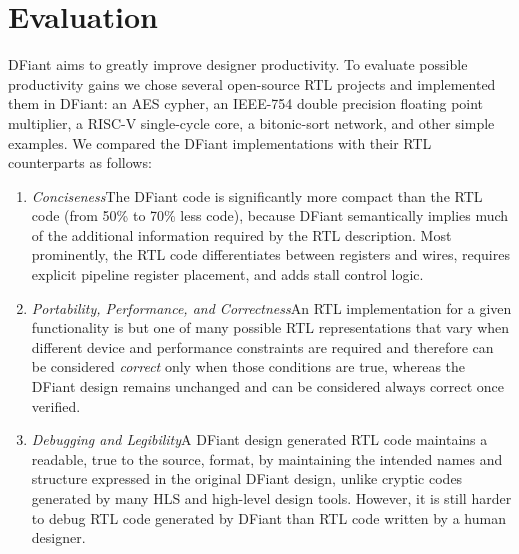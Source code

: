 \section{Evaluation}
\label{sec:evaluation}
DFiant aims to greatly improve designer productivity. To evaluate possible productivity gains we chose several open-source RTL projects and implemented them in DFiant: an AES cypher, an IEEE-754 double precision floating point multiplier, a RISC-V single-cycle core, a bitonic-sort network, and other simple examples.
We compared the DFiant implementations with their RTL counterparts as follows:
\begin{enumerate}[leftmargin=*]
	\item \textit{Conciseness}\quad The DFiant code is significantly more compact than the RTL code (from 50\% to 70\% less code), because DFiant semantically implies much of the additional information required by the RTL description. Most prominently, the RTL code differentiates between registers and wires, requires explicit pipeline register placement, and adds stall control logic. 
	\item \textit{Portability, Performance, and Correctness}\quad An RTL implementation for a given functionality is but one of many possible RTL representations that vary when different device and performance constraints are required and therefore can be considered \textit{correct} only when those conditions are true, whereas the DFiant design remains unchanged and can be considered always correct once verified. 
	\item \textit{Debugging and Legibility}\quad A DFiant design generated RTL code maintains a readable, true to the source, format, by maintaining the intended names and structure expressed in the original DFiant design, unlike cryptic codes generated by many HLS and high-level design tools. However, it is still harder to debug RTL code generated by DFiant than RTL code written by a human designer.
\end{enumerate} 




